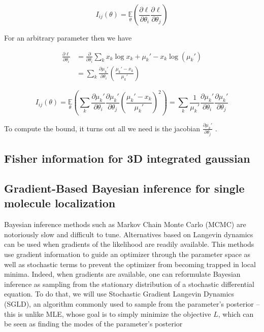 \documentclass{ucetd}
\begin{document}
\begin{equation}
I_{ij}(\theta) = \underset{\theta}{\mathbb{E}}\left(\frac{\partial \ell}{\partial\theta_{i}}\frac{\partial\ell}{\partial\theta_{j}}\right) 
\end{equation}

For an arbitrary parameter then we have

\begin{align*}
\frac{\partial \ell}{\partial \theta_{i}} &= \frac{\partial}{\partial \theta_{i}} \sum_{k}  x_{k}\log x_{k} + \mu_{k}' - x_{k}\log\left(\mu_{k}'\right)\\
&= \sum_{k} \frac{\partial \mu_{k}'}{\partial\theta_{i}} \left(\frac{\mu_{k}'-x_{k}}{\mu_{k}'}\right)
\end{align*}

\begin{equation*}
I_{ij}(\theta) = \underset{\theta}{\mathbb{E}}\left(\sum_{k}\frac{\partial \mu_{k}'}{\partial\theta_{i}}\frac{\partial \mu_{k}'}{\partial\theta_{j}} \left(\frac{\mu_{k}'-x_{k}}{\mu_{k}'}\right)^{2}\right) = \sum_{k}\frac{1}{\mu_{k}'}\frac{\partial \mu_{k}'}{\partial\theta_{i}}\frac{\partial \mu_{k}'}{\partial\theta_{j}}
\end{equation*}

To compute the bound, it turns out all we need is the jacobian $\frac{\partial \mu_{k}'}{\partial\theta_{j}} $ . 
\subsection{Fisher information for 3D integrated gaussian}




\subsection{Gradient-Based Bayesian inference for single molecule localization}

Bayesian inference methods such as Markov Chain Monte Carlo (MCMC) are notoriously slow and difficult to tune. Alternatives based on Langevin dynamics can be used when gradients of the likelihood are readily available. This methods use gradient information to guide an optimizer through the parameter space as well as stochastic terms to prevent the optimizer from becoming trapped in local minima. Indeed, when gradients are available, one can reformulate Bayesian inference as sampling from the stationary distribution of a stochastic differential equation. To do that, we will use Stochastic Gradient Langevin Dynamics (SGLD), an algorithm commonly used to sample from the parameter's posterior -- this is unlike MLE, whose goal is to simply minimize the objective $L$, which can be seen as finding the modes of the parameter's posterior
\end{document}

